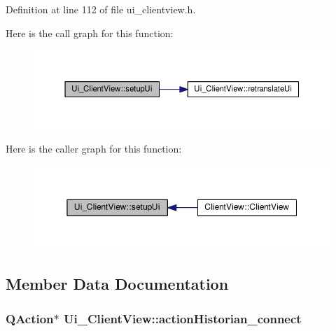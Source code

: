 Definition at line 112 of file ui\+\_\+clientview.\+h.



Here is the call graph for this function\+:
\nopagebreak
\begin{figure}[H]
\begin{center}
\leavevmode
\includegraphics[width=350pt]{class_ui___client_view_adff119c9cb5075faa8716d48a69a328c_cgraph}
\end{center}
\end{figure}




Here is the caller graph for this function\+:
\nopagebreak
\begin{figure}[H]
\begin{center}
\leavevmode
\includegraphics[width=350pt]{class_ui___client_view_adff119c9cb5075faa8716d48a69a328c_icgraph}
\end{center}
\end{figure}




\subsection{Member Data Documentation}
\hypertarget{class_ui___client_view_ab0d03e99eda22a508ad1b71730572012}{}
\subsubsection[{action\+Historian\+\_\+connect}]{\setlength{\rightskip}{0pt plus 5cm}Q\+Action$\ast$ Ui\+\_\+\+Client\+View\+::action\+Historian\+\_\+connect}\label{class_ui___client_view_ab0d03e99eda22a508ad1b71730572012}


